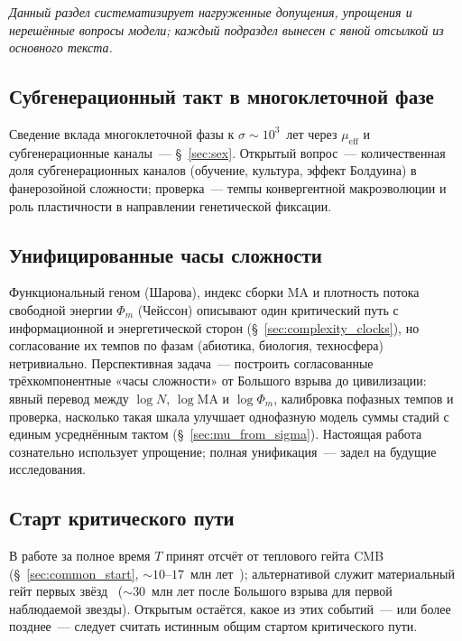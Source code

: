 \documentclass[12pt,a4paper]{article}
\begin{document}
\textit{Данный раздел систематизирует нагруженные допущения, упрощения и нерешённые вопросы модели; каждый подраздел вынесен с явной отсылкой из основного текста.}

\subsection{Субгенерационный такт в многоклеточной фазе}
\label{sec:macro_tempo}

Сведение вклада многоклеточной фазы к $\sigma \sim 10^3$~лет через $\mu_{\mathrm{eff}}$ и субгенерационные каналы~--- \S~\ref{sec:sex}. Открытый вопрос~--- количественная доля субгенерационных каналов (обучение, культура, эффект Болдуина) в фанерозойной сложности; проверка~--- темпы конвергентной макроэволюции и роль пластичности в направлении генетической фиксации.

\subsection{Унифицированные часы сложности}
\label{sec:unified_clocks}

Функциональный геном (Шарова), индекс сборки MA и плотность потока свободной энергии $\Phi_m$ (Чейссон) описывают один критический путь с информационной и энергетической сторон (\S~\ref{sec:complexity_clocks}), но согласование их темпов по фазам (абиотика, биология, техносфера) нетривиально. Перспективная задача~--- построить согласованные трёхкомпонентные «часы сложности» от Большого взрыва до цивилизации: явный перевод между $\log N$, $\log \mathrm{MA}$ и $\log \Phi_m$, калибровка пофазных темпов и проверка, насколько такая шкала улучшает однофазную модель суммы стадий с единым усреднённым тактом (\S~\ref{sec:mu_from_sigma}). Настоящая работа сознательно использует упрощение; полная унификация~--- задел на будущие исследования.

\subsection{Старт критического пути}
\label{sec:open_start}

В работе за полное время $T$ принят отсчёт от теплового гейта CMB (\S~\ref{sec:common_start}, $\sim 10$--$17$~млн лет~\cite{Loeb2014}); альтернативой служит материальный гейт первых звёзд~\cite{Naoz2006} ($\sim 30$~млн лет после Большого взрыва для первой наблюдаемой звезды). Открытым остаётся, какое из этих событий~--- или более позднее~--- следует считать истинным общим стартом критического пути.
\end{document}
